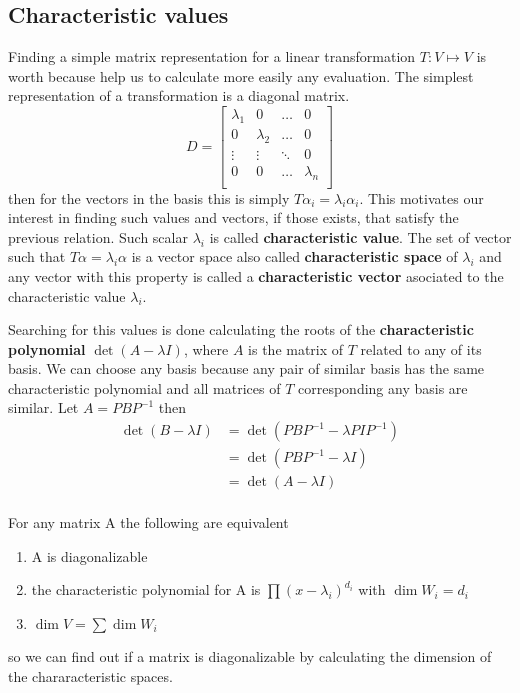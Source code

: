 \documentclass[../main.tex]{subfiles}
\begin{document}
\subsection{Characteristic values}
Finding a simple matrix representation for a linear transformation $T:V\mapsto V$ is worth because help us to calculate more easily any evaluation. The simplest representation of a transformation is a diagonal matrix.
\begin{equation*}
    D = \begin{bmatrix}
        \lambda_1 & 0 & \dots & 0\\
        0 & \lambda_2 & \dots & 0\\
        \vdots & \vdots & \ddots & 0\\
        0 & 0 & \dots & \lambda_n\\
    \end{bmatrix}
\end{equation*}
then for the vectors in the basis this is simply $T\alpha_i = \lambda_i \alpha_i$. This motivates our interest in finding such values and vectors, if those exists, that satisfy the previous relation. Such scalar $\lambda_i$ is called \textbf{characteristic value}. The set of vector such that $T\alpha = \lambda_i \alpha$ is a vector space also called \textbf{characteristic space} of $\lambda_i$ and any vector with this property is called a \textbf{characteristic vector} asociated to the characteristic value $\lambda_i$.

Searching for this values is done calculating the roots of the \textbf{characteristic polynomial} $\det(A-\lambda I)$, where $A$ is the matrix of $T$ related to any of its basis. We can choose any basis because any pair of similar basis has the same characteristic polynomial and all matrices of $T$ corresponding any basis are similar. Let $A = PBP^{-1}$ then
\begin{align*}
    \det(B-\lambda I) 
    &= \det(PBP^{-1}-\lambda PIP^{-1})\\
    &= \det(PBP^{-1}-\lambda I)\\
    &= \det(A-\lambda I)\\
\end{align*}

For any matrix A the following are equivalent
\begin{enumerate}
    \item A is diagonalizable
    \item the characteristic polynomial for A is $\prod(x-\lambda_i)^{d_i}$ with $\dim W_i = d_i$
    \item $\dim V = \sum \dim W_i$
\end{enumerate}
so we can find out if a matrix is diagonalizable by calculating the dimension of the chararacteristic spaces.
\end{document}
